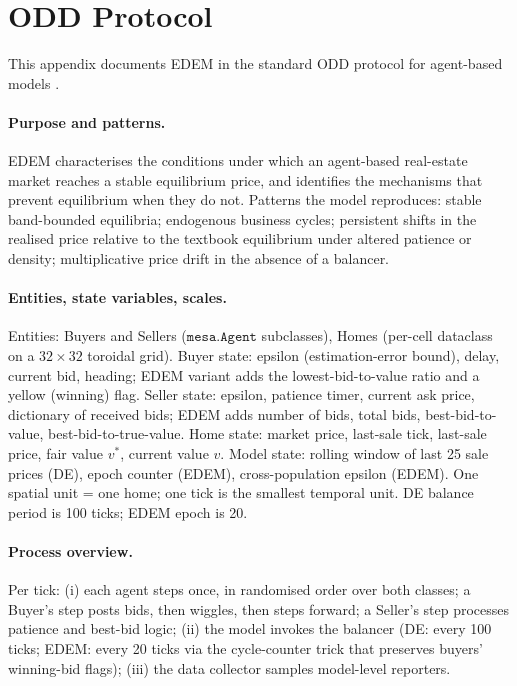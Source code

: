 \documentclass{article}
\begin{document}
\nocite{arbuzov2018de,arbuzov2018edem}




\clearpage
\appendix

\section{ODD Protocol}
\label{app:odd}

This appendix documents EDEM in the standard ODD protocol for
agent-based models \citep{grimm2020odd}.

\paragraph{Purpose and patterns.} EDEM characterises the conditions
under which an agent-based real-estate market reaches a stable
equilibrium price, and identifies the mechanisms that prevent
equilibrium when they do not. Patterns the model reproduces: stable
band-bounded equilibria; endogenous business cycles; persistent
shifts in the realised price relative to the textbook equilibrium
under altered patience or density; multiplicative price drift in
the absence of a balancer.

\paragraph{Entities, state variables, scales.}
Entities: Buyers and Sellers ($\mathtt{mesa.Agent}$ subclasses),
Homes (per-cell dataclass on a $32\times 32$ toroidal grid).
Buyer state: epsilon (estimation-error bound), delay, current bid,
heading; EDEM variant adds the lowest-bid-to-value ratio and a
yellow (winning) flag. Seller state: epsilon, patience timer,
current ask price, dictionary of received bids; EDEM adds number of
bids, total bids, best-bid-to-value, best-bid-to-true-value. Home
state: market price, last-sale tick, last-sale price, fair value
$v^{*}$, current value $v$. Model state: rolling window of last 25
sale prices (DE), epoch counter (EDEM), cross-population epsilon
(EDEM). One spatial unit = one home; one tick is the smallest
temporal unit. DE balance period is 100 ticks; EDEM epoch is 20.

\paragraph{Process overview.}
Per tick: (i) each agent steps once, in randomised order over both
classes; a Buyer's step posts bids, then wiggles, then steps
forward; a Seller's step processes patience and best-bid logic;
(ii) the model invokes the balancer (DE: every 100 ticks; EDEM:
every 20 ticks via the cycle-counter trick that preserves
buyers' winning-bid flags); (iii) the data collector samples
model-level reporters.
\end{document}
